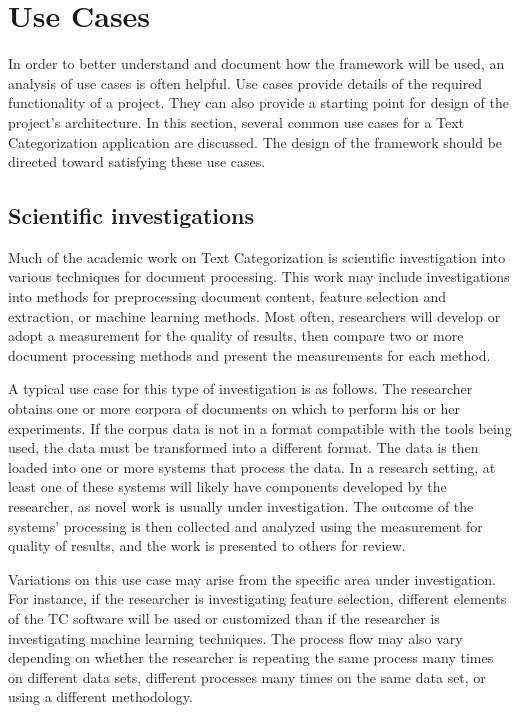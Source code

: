 \section{Use Cases}
\label{use-cases}

In order to better understand and document how the framework will be
used, an analysis of use cases is often
helpful. \cite[XXX-section]{jacobson:92} Use cases provide details of
the required functionality of a project.  They can also provide a
starting point for design of the project's architecture.  In this
section, several common use cases for a Text Categorization
application are discussed.  The design of the framework should be
directed toward satisfying these use cases.

\subsection{Scientific investigations}

Much of the academic work on Text Categorization is scientific
investigation into various techniques for document
processing. \cite{sebastiani:02} This work may include investigations
into methods for preprocessing document content, feature selection and
extraction, or machine learning methods.  Most often, researchers will
develop or adopt a measurement for the quality of results, then
compare two or more document processing methods and present the
measurements for each method.

A typical use case for this type of investigation is as follows.  The
researcher obtains one or more corpora of documents on which to
perform his or her experiments.  If the corpus data is not in a format
compatible with the tools being used, the data must be transformed
into a different format.  The data is then loaded into one or more
systems that process the data.  In a research setting, at least one of
these systems will likely have components developed by the researcher,
as novel work is usually under investigation.  The outcome of the
systems' processing is then collected and analyzed using the
measurement for quality of results, and the work is presented to
others for review.

Variations on this use case may arise from the specific area under
investigation.  For instance, if the researcher is investigating
feature selection, different elements of the TC software will be used
or customized than if the researcher is investigating machine learning
techniques.  The process flow may also vary depending on whether the
researcher is repeating the same process many times on different data
sets, different processes many times on the same data set, or using a
different methodology.

